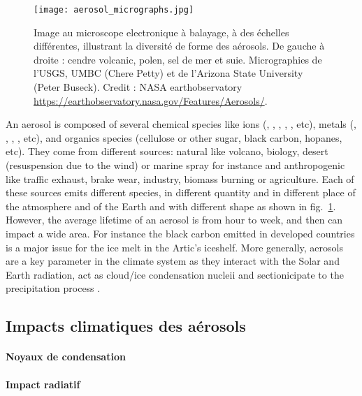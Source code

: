 \begin{figure}[ht]
    \centering
    \texttt{[image: aerosol\_micrographs.jpg]}
    \caption{Image au microscope electronique à balayage, à des échelles différentes,
        illustrant la diversité de forme des aérosols.
        De gauche à droite : cendre volcanic, polen, sel de mer et suie. Micrographies de
        l'USGS, UMBC (Chere Petty) et de l'Arizona State University (Peter Buseck). Credit
        : NASA earthobservatory
    \url{https://earthobservatory.nasa.gov/Features/Aerosols/}.}
    \label{fig:micrography}
\end{figure}
An aerosol is composed of several chemical species like ions (\SOq, \NOt, ,
, , etc), metals (, , , , etc), and organics species
(cellulose or other sugar, \og black carbon\fg, hopanes, etc).  They come from different
sources: natural like volcano, biology, desert (resuspension due to the wind) or marine
spray for instance and anthropogenic like traffic exhaust, brake wear, industry, biomass
burning or agriculture.  Each of these sources emits different species, in different
quantity and in different place of the atmosphere and of the Earth and with different
shape as shown in fig.~\ref{fig:micrography}.  However, the average lifetime of an aerosol
is from hour to week, and then can impact a wide area.  For instance the black carbon
emitted in developed countries is a major issue for the ice melt in the Artic's iceshelf.
More generally, aerosols are a key parameter in the climate system as they interact with
the Solar and Earth radiation, act as cloud/ice condensation nucleii and sectionicipate to
the precipitation process \autocite{boucherClouds2013}.


\subsection{Impacts climatiques des aérosols}%
\label{sub:impacts_climatiques_des_aerosols}
\paragraph{Noyaux de condensation}%
\label{par:noyaux_de_condensation}

\paragraph{Impact radiatif}%
\label{par:impact_radiatif}



